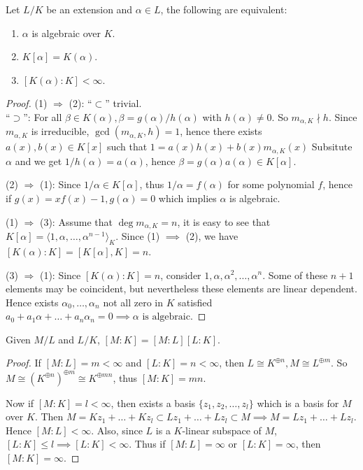 \begin{prop}
  Let $L/K$ be an extension and $\alpha \in L$, the following are equivalent:
  \begin{enumerate}[(\arabic*)]
    \item $\alpha$ is algebraic over $K$.
    \item $K[\alpha] = K(\alpha)$.
    \item $[K(\alpha): K] < \infty$.
  \end{enumerate}

  \begin{proof}
    (1) $\Rightarrow$ (2): ``$\subset$'' trivial. \\
    ``$\supset$'': For all $\beta \in K(\alpha), \beta = g(\alpha) / h(\alpha)$ with $h(\alpha) \neq 0$.
    So $m_{\alpha, K} \nmid h$. Since $m_{\alpha, K}$ is irreducible, $\gcd(m_{\alpha, K}, h) = 1$,
    hence there exists $a(x), b(x) \in K[x]$ such that $1 = a(x) h(x) + b(x) m_{\alpha, K}(x)$
    Subsitute $\alpha$ and we get $1/h(\alpha) = a(\alpha)$, hence $\beta = g(\alpha) a(\alpha) \in K[\alpha]$.

    (2) $\Rightarrow$ (1): Since $1 / \alpha \in K[\alpha]$, thus $1 / \alpha = f(\alpha)$ for some
    polynomial $f$, hence if $g(x) = xf(x) - 1, g(\alpha) = 0$ which implies $\alpha$ is algebraic.

    (1) $\Rightarrow$ (3): Assume that $\deg m_{\alpha, K} = n$, it is easy to see that
    $K[\alpha] = \langle 1, \alpha, \dots, \alpha^{n-1} \rangle_K$. Since (1) $\implies$ (2),
    we have $[K(\alpha): K] = [K[\alpha], K] = n$.

    (3) $\Rightarrow$ (1): Since $[K(\alpha): K] = n$, consider $1, \alpha, \alpha^2, \dots, \alpha^n$.
    Some of these $n+1$ elements may be coincident, but nevertheless these elements are linear dependent.
    Hence exists $\alpha_0, \dots, \alpha_n$ not all zero in $K$ satisfied
    $a_0 + a_1 \alpha + \dots + a_n \alpha_n = 0 \implies \alpha \text{ is algebraic.}$
  \end{proof}
\end{prop}

\begin{prop}
  Given $M/L$ and $L/K$, $[M: K] = [M: L] [L: K]$.

  \begin{proof}
    If $[M:L] = m < \infty$ and $[L:K] = n < \infty$, then $L \cong K^{\oplus n}, M \cong L^{\oplus m}$.
    So $M \cong \left( K^{\oplus n} \right)^{\oplus m} \cong K^{\oplus mn}$, thus $[M: K] = mn$.

    Now if $[M: K] = l < \infty$, then exists a basis $\{ z_1, z_2, \dots, z_l \}$ which is a basis for $M$
    over $K$. Then $M = K z_1 + \dots + K z_l \subset L z_1 + \dots + L z_l \subset M \implies
    M = L z_1 + \dots + L z_l$. Hence $[M: L] < \infty$. Also, since $L$ is a $K$-linear
    subspace of $M$, $[L: K] \leq l \implies [L: K] < \infty$. Thus if $[M: L] = \infty$ or $[L: K] = \infty$,
    then $[M: K] = \infty$.
  \end{proof}
\end{prop}

